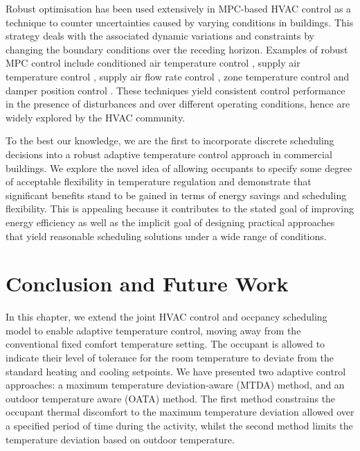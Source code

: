 Robust optimisation has been used extensively in MPC-based HVAC control as a technique to counter uncertainties caused by varying conditions in buildings. This strategy deals with the associated dynamic variations and constraints by changing the boundary conditions over the receding horizon. Examples of robust MPC control include conditioned air temperature control \citep{huang2009robust}, supply air temperature control \citep{anderson2008mimo}, supply air flow rate control \citep{anderson2008mimo}, zone temperature control \citep{al2004robust,huang2011Model} and damper position control \citep{huang2011Model}. These techniques yield consistent control performance in the presence of disturbances and over different operating conditions, hence are widely explored by the HVAC community. 

To the best our knowledge, we are the first to incorporate discrete scheduling decisions into a robust adaptive temperature control approach in  commercial buildings. We explore the novel idea of allowing occupants to specify some degree of acceptable flexibility in temperature regulation and demonstrate that significant benefits stand to be gained in terms of energy savings and scheduling flexibility. This is appealing because it contributes to the stated goal of improving energy efficiency as well as the implicit goal of designing practical approaches that yield reasonable scheduling solutions under a wide range of conditions. %


\section{Conclusion and Future Work}\label{sec:atc_conclusion}

In this chapter, we extend the joint HVAC control and occpancy scheduling model to enable adaptive temperature control, moving away from the conventional fixed comfort temperature setting. The occupant is allowed to indicate their level of tolerance for the room temperature to deviate from the standard heating and cooling setpoints. We have presented two adaptive control approaches: a maximum temperature deviation-aware (MTDA) method, and an outdoor temperature aware (OATA) method. The first method constrains the occupant thermal discomfort to the maximum temperature deviation allowed over a specified period of time during the activity, whilst the second method limits the temperature deviation based on outdoor temperature. 

